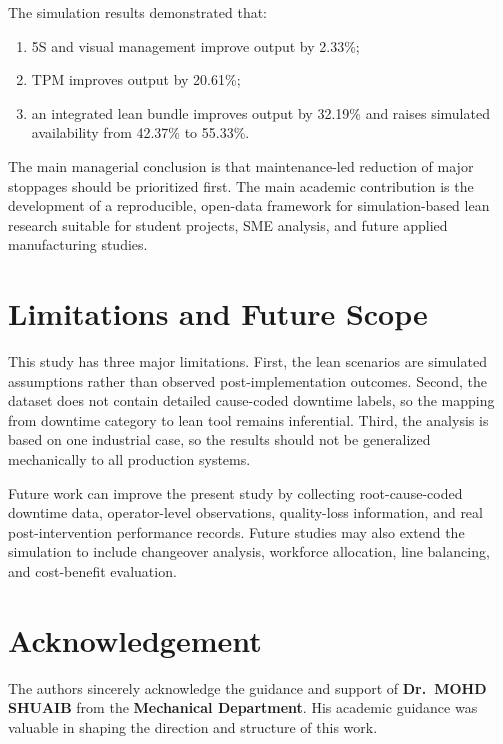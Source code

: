 \documentclass[12pt,a4paper]{article}
\begin{document}
The simulation results demonstrated that:
\begin{enumerate}
    \item 5S and visual management improve output by 2.33\%;
    \item TPM improves output by 20.61\%;
    \item an integrated lean bundle improves output by 32.19\% and raises simulated availability from 42.37\% to 55.33\%.
\end{enumerate}

The main managerial conclusion is that maintenance-led reduction of major stoppages should be prioritized first. The main academic contribution is the development of a reproducible, open-data framework for simulation-based lean research suitable for student projects, SME analysis, and future applied manufacturing studies.

\section{Limitations and Future Scope}
This study has three major limitations. First, the lean scenarios are simulated assumptions rather than observed post-implementation outcomes. Second, the dataset does not contain detailed cause-coded downtime labels, so the mapping from downtime category to lean tool remains inferential. Third, the analysis is based on one industrial case, so the results should not be generalized mechanically to all production systems.

Future work can improve the present study by collecting root-cause-coded downtime data, operator-level observations, quality-loss information, and real post-intervention performance records. Future studies may also extend the simulation to include changeover analysis, workforce allocation, line balancing, and cost-benefit evaluation.

\section*{Acknowledgement}
The authors sincerely acknowledge the guidance and support of \textbf{Dr.\ MOHD SHUAIB} from the \textbf{Mechanical Department}. His academic guidance was valuable in shaping the direction and structure of this work.
\end{document}
